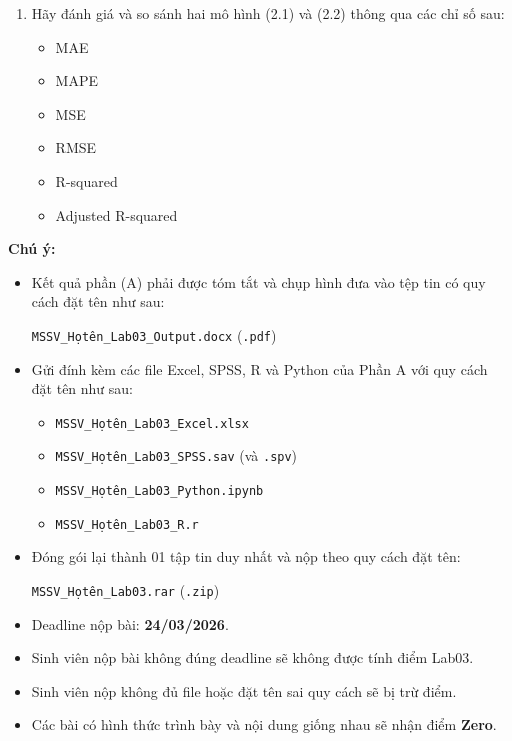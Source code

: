 \begin{enumerate}
\begin{enumerate}
\item[2.3] Hãy đánh giá và so sánh hai mô hình (2.1) và (2.2) thông qua các 
chỉ số sau:

\begin{itemize}
\item MAE
\item MAPE
\item MSE
\item RMSE
\item R-squared
\item Adjusted R-squared
\end{itemize}

\end{enumerate}

\end{enumerate}

\textbf{Chú ý:}

\begin{itemize}

\item Kết quả phần (A) phải được tóm tắt và chụp hình đưa vào tệp tin có quy cách 
đặt tên như sau:

\texttt{MSSV\_Họtên\_Lab03\_Output.docx} (\texttt{.pdf})

\item Gửi đính kèm các file Excel, SPSS, R và Python của Phần A với quy cách 
đặt tên như sau:

\begin{itemize}

\item \texttt{MSSV\_Họtên\_Lab03\_Excel.xlsx}
\item \texttt{MSSV\_Họtên\_Lab03\_SPSS.sav} (và \texttt{.spv})
\item \texttt{MSSV\_Họtên\_Lab03\_Python.ipynb}
\item \texttt{MSSV\_Họtên\_Lab03\_R.r}

\end{itemize}

\item Đóng gói lại thành 01 tập tin duy nhất và nộp theo quy cách đặt tên:

\texttt{MSSV\_Họtên\_Lab03.rar} (\texttt{.zip})

\item Deadline nộp bài: \textbf{24/03/2026}.

\item Sinh viên nộp bài không đúng deadline sẽ không được tính điểm Lab03.

\item Sinh viên nộp không đủ file hoặc đặt tên sai quy cách sẽ bị trừ điểm.

\item Các bài có hình thức trình bày và nội dung giống nhau sẽ nhận điểm \textbf{Zero}.

\end{itemize}